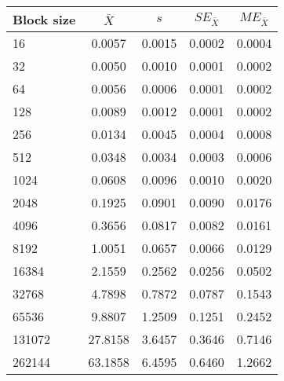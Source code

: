 \begin{tabular}{lcccc}\toprule
{\small Block size} & $\bar{X}$ & $s$ & $SE_{\bar{X}}$ & $ME_{\bar{X}}$ \\\midrule
16 & 0.0057 & 0.0015 & 0.0002 & 0.0004\\
32 & 0.0050 & 0.0010 & 0.0001 & 0.0002\\
64 & 0.0056 & 0.0006 & 0.0001 & 0.0002\\
128 & 0.0089 & 0.0012 & 0.0001 & 0.0002\\
256 & 0.0134 & 0.0045 & 0.0004 & 0.0008\\
512 & 0.0348 & 0.0034 & 0.0003 & 0.0006\\
1024 & 0.0608 & 0.0096 & 0.0010 & 0.0020\\
2048 & 0.1925 & 0.0901 & 0.0090 & 0.0176\\
4096 & 0.3656 & 0.0817 & 0.0082 & 0.0161\\
8192 & 1.0051 & 0.0657 & 0.0066 & 0.0129\\
16384 & 2.1559 & 0.2562 & 0.0256 & 0.0502\\
32768 & 4.7898 & 0.7872 & 0.0787 & 0.1543\\
65536 & 9.8807 & 1.2509 & 0.1251 & 0.2452\\
131072 & 27.8158 & 3.6457 & 0.3646 & 0.7146\\
262144 & 63.1858 & 6.4595 & 0.6460 & 1.2662\\
\bottomrule
\end{tabular}
